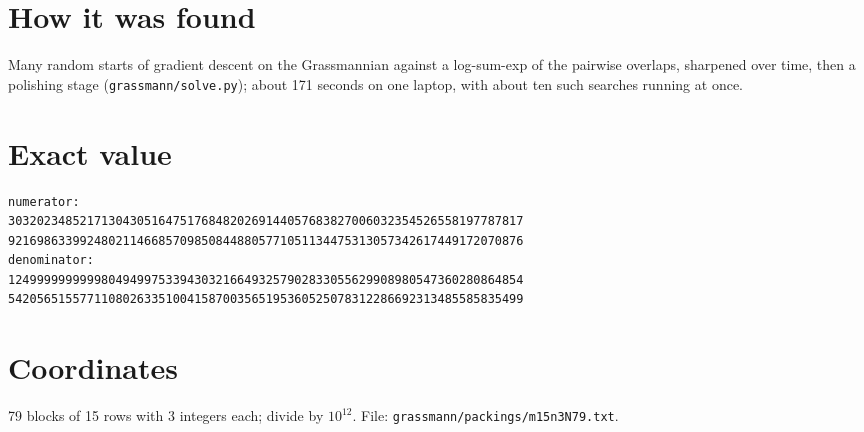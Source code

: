 \documentclass[11pt,a4paper]{article}
\begin{document}
\section{How it was found}
Many random starts of gradient descent on the Grassmannian against a log-sum-exp of the pairwise overlaps, sharpened over time, then a polishing stage (\texttt{grassmann/solve.py}); about 171 seconds on one laptop, with about ten such searches running at once.


\appendix
\section{Exact value}
{\small
\begin{verbatim}
numerator:
303202348521713043051647517684820269144057683827006032354526558197787817
921698633992480211466857098508448805771051134475313057342617449172070876
denominator:
124999999999980494997533943032166493257902833055629908980547360280864854
542056515577110802633510041587003565195360525078312286692313485585835499
\end{verbatim}}

\section{Coordinates}
79 blocks of 15 rows with 3 integers each; divide by $10^{12}$. File: \texttt{grassmann/packings/m15n3N79.txt}.
{\tiny
\begin{multicols}{3}
\end{multicols}}
\end{document}
